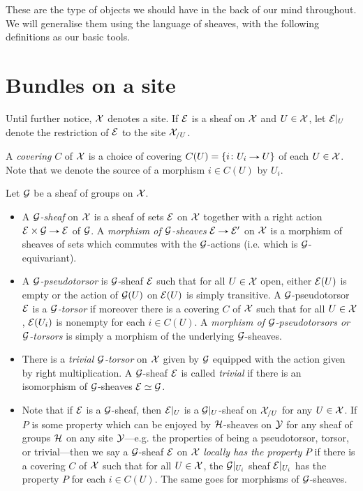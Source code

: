 These are the type of objects we should have in the back of our mind
throughout. We will generalise them using the language of sheaves,
with the following definitions as our basic tools.


\section{Bundles on a site}

\begin{notation}
  Until further notice, $\mathcal{X}$ denotes a site. If $\mathcal{E}$ is a sheaf on
  $\mathcal{X}$ and $U \in \mathcal{X}$, let $\mathcal{E}|_U$ denote the restriction of $\mathcal{E}$ to
  the site $\mathcal{X}_{/U}$.
\end{notation}

\begin{definition}
  A \emph{covering} $C$ of $\mathcal{X}$ is a choice of covering $C(U) = \{i \c
  U_i \to U\}$ of each $U \in \mathcal{X}$. Note that we denote the source of a
  morphism $i \in C(U)$ by $U_i$.
\end{definition}

\begin{definitions}
  Let $\mathcal{G}$ be a sheaf of groups on $\mathcal{X}$.
  \begin{itemize}
  \item A \emph{$\mathcal{G}$-sheaf} on $\mathcal{X}$ is a sheaf of sets $\mathcal{E}$ on $\mathcal{X}$
    together with a right action $\E \times \G \to \E$ of $\mathcal{G}$. A
    \emph{morphism of $\mathcal{G}$-sheaves} $\E \to \E'$ on $\mathcal{X}$ is a morphism
    of sheaves of sets which commutes with the $\mathcal{G}$-actions
    (i.e. which is $\mathcal{G}$-equivariant).
  \item A \emph{$\mathcal{G}$-pseudotorsor} is $\mathcal{G}$-sheaf $\mathcal{E}$ such that for
    all $U \in \mathcal{X}$ open, either $\mathcal{E}(U)$ is empty or the action of
    $\mathcal{G}(U)$ on $\mathcal{E}(U)$ is simply transitive. A $\mathcal{G}$-pseudotorsor $\mathcal{E}$
    is a \emph{$\mathcal{G}$-torsor} if moreover there is a covering $C$ of
    $\mathcal{X}$ such that for all $U \in \mathcal{X}$, $\mathcal{E}(U_i)$ is nonempty for each
    $i \in C(U)$. A \emph{morphism of $\mathcal{G}$-pseudotorsors or
      $\mathcal{G}$-torsors} is simply a morphism of the underlying
    $\mathcal{G}$-sheaves.
  \item There is a \emph{trivial $\mathcal{G}$-torsor} on $\mathcal{X}$ given by $\mathcal{G}$
    equipped with the action given by right multiplication. A
    $\mathcal{G}$-sheaf $\mathcal{E}$ is called \emph{trivial} if there is an
    isomorphism of $\mathcal{G}$-sheaves $\mathcal{E} \simeq \mathcal{G}$.
  \item Note that if $\mathcal{E}$ is a $\mathcal{G}$-sheaf, then $\mathcal{E}|_U$ is a
    $\mathcal{G}|_U$-sheaf on $\mathcal{X}_{/U}$ for any $U \in \mathcal{X}$. If $P$ is some
    property which can be enjoyed by $\mathcal{H}$-sheaves on $\mathcal{Y}$ for any
    sheaf of groups $\mathcal{H}$ on any site $\mathcal{Y}$---e.g. the properties of
    being a pseudotorsor, torsor, or trivial---then we say a
    $\mathcal{G}$-sheaf $\mathcal{E}$ on $\mathcal{X}$ \emph{locally has the property} $P$ if
    there is a covering $C$ of $\mathcal{X}$ such that for all $U \in \mathcal{X}$, the
    $\mathcal{G}|_{U_i}$ sheaf $\mathcal{E}|_{U_i}$ has the property $P$ for each $i \in
    C(U)$. The same goes for morphisms of $\mathcal{G}$-sheaves.
  \end{itemize}
\end{definitions}

